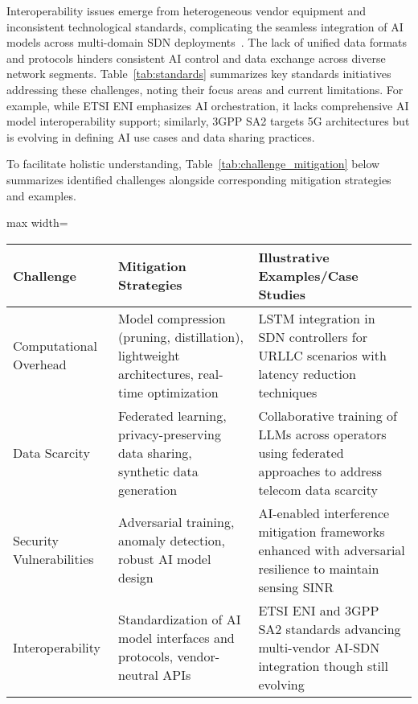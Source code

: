 \documentclass[sigconf]{acmart}
\begin{document}
Interoperability issues emerge from heterogeneous vendor equipment and inconsistent technological standards, complicating the seamless integration of AI models across multi-domain SDN deployments~\cite{ref7}. The lack of unified data formats and protocols hinders consistent AI control and data exchange across diverse network segments. Table~\ref{tab:standards} summarizes key standards initiatives addressing these challenges, noting their focus areas and current limitations. For example, while ETSI ENI emphasizes AI orchestration, it lacks comprehensive AI model interoperability support; similarly, 3GPP SA2 targets 5G architectures but is evolving in defining AI use cases and data sharing practices.

To facilitate holistic understanding, Table~\ref{tab:challenge_mitigation} below summarizes identified challenges alongside corresponding mitigation strategies and examples.

\begin{table*}[htbp]
\centering
\caption{Summary of AI-SDN Challenges with Corresponding Mitigation Strategies and Examples}
\label{tab:challenge_mitigation}
\begin{adjustbox}{max width=\textwidth}
\begin{tabular}{@{}lll@{}}
\toprule
\textbf{Challenge} & \textbf{Mitigation Strategies} & \textbf{Illustrative Examples/Case Studies} \\ \midrule
Computational Overhead & Model compression (pruning, distillation), lightweight architectures, real-time optimization & LSTM integration in SDN controllers for URLLC scenarios with latency reduction techniques~\cite{ref52} \\
Data Scarcity & Federated learning, privacy-preserving data sharing, synthetic data generation & Collaborative training of LLMs across operators using federated approaches to address telecom data scarcity~\cite{ref7} \\
Security Vulnerabilities & Adversarial training, anomaly detection, robust AI model design & AI-enabled interference mitigation frameworks enhanced with adversarial resilience to maintain sensing SINR~\cite{ref48} \\
Interoperability & Standardization of AI model interfaces and protocols, vendor-neutral APIs & ETSI ENI and 3GPP SA2 standards advancing multi-vendor AI-SDN integration though still evolving~\cite{ref7} \\ \bottomrule
\end{tabular}
\end{adjustbox}
\end{table*}
\end{document}
